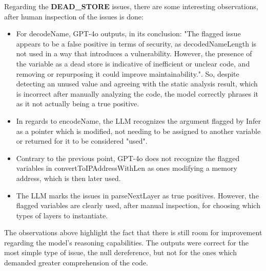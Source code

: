 Regarding the \textbf{DEAD\_STORE} issues, there are some interesting observations, after human inspection of the issues is done:
\begin{itemize}
    \item For decodeName, GPT-4o outputs, in its conclusion: "The flagged issue appears to be a false positive in terms of security, as decodedNameLength is not used in a way that introduces a vulnerability. However, the presence of the variable as a dead store is indicative of inefficient or unclear code, and removing or repurposing it could improve maintainability.". So, despite detecting an unused value and agreeing with the static analysis result, which is incorrect after manually analyzing the code, the model correctly phrases it as it not actually being a true positive. 
    \item In regards to encodeName, the LLM recognizes the argument flagged by Infer as a pointer which is modified, not needing to be assigned to another variable or returned for it to be considered "used".
    \item Contrary to the previous point, GPT-4o does not recognize the flagged variables in convertToIPAddressWithLen as ones modifying a memory address, which is then later used.
    \item The LLM marks the issues in parseNextLayer as true positives. However, the flagged variables are clearly used, after manual inspection, for choosing which types of layers to instantiate.
\end{itemize}

The observations above highlight the fact that there is still room for improvement regarding the model's reasoning capabilities. The outputs were correct for the most simple type of issue, the null dereference, but not for the ones which demanded greater comprehension of the code.